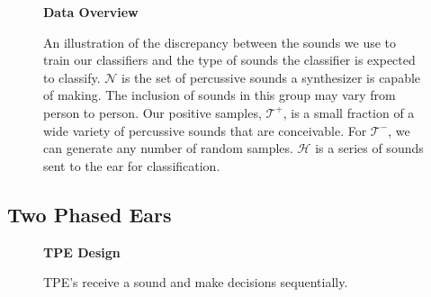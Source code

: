 \documentclass[\main/thesis.tex]{subfiles}
\begin{document}
\begin{figure}[htbp!]
    \begin{center}
    \textbf{Data Overview}
    \end{center}
    \caption{ An illustration of the discrepancy between the sounds we use to train our classifiers and the type of sounds the classifier is expected to classify. $\mathcal{N}$ is the set of percussive sounds a synthesizer is capable of making. The inclusion of sounds in this group may vary from person to person. Our positive samples, $\mathcal{T^{+}}$, is a small fraction of a wide variety of percussive sounds that are conceivable. For $\mathcal{T^{-}}$, we can generate any number of random samples. $\mathcal{H}$ is a series of sounds sent to the ear for classification.}
\label{fig:ven_data}
\end{figure}
\subsection{Two Phased Ears}
\begin{figure}[t!]
    \begin{center}
    \textbf{TPE Design}
    \end{center}
    \caption{TPE's receive a sound and make decisions sequentially.}
\label{fig:TPE_design}
\end{figure}
\end{document}
